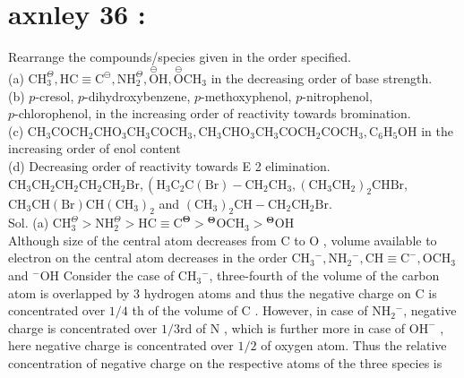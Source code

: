 \documentclass[10pt]{article}
\begin{document}
\section*{axnley 36 :}
Rearrange the compounds/species given in the order specified.\\
(a) $\mathrm{CH}_{3}^{\Theta}, \mathrm{HC} \equiv \mathrm{C}^{\ominus}, \mathrm{NH}_{2}^{\Theta}, \stackrel{\ominus}{\mathrm{O}} \mathrm{H}, \stackrel{\ominus}{\mathrm{O}} \mathrm{CH}_{3}$ in the decreasing order of base strength.\\
(b) $p$-cresol, $p$-dihydroxybenzene, $p$-methoxyphenol, $p$-nitrophenol,\\
$p$-chlorophenol, in the increasing order of reactivity towards bromination.\\
(c) $\mathrm{CH}_{3} \mathrm{COCH}_{2} \mathrm{CHO}_{3} \mathrm{CH}_{3} \mathrm{COCH}_{3}, \mathrm{CH}_{3} \mathrm{CHO}_{3} \mathrm{CH}_{3} \mathrm{COCH}_{2} \mathrm{COCH}_{3}, \mathrm{C}_{6} \mathrm{H}_{5} \mathrm{OH}$ in the increasing order of enol content\\
(d) Decreasing order of reactivity towards E 2 elimination.\\
$\mathrm{CH}_{3} \mathrm{CH}_{2} \mathrm{CH}_{2} \mathrm{CH}_{2} \mathrm{CH}_{2} \mathrm{Br},\left(\mathrm{H}_{3} \mathrm{C}_{2} \mathrm{C}(\mathrm{Br})-\mathrm{CH}_{2} \mathrm{CH}_{3},\left(\mathrm{CH}_{3} \mathrm{CH}_{2}\right)_{2} \mathrm{CHBr}\right.$,\\
$\mathrm{CH}_{3} \mathrm{CH}(\mathrm{Br}) \mathrm{CH}\left(\mathrm{CH}_{3}\right)_{2}$ and $\left(\mathrm{CH}_{3}\right)_{2} \mathrm{CH}-\mathrm{CH}_{2} \mathrm{CH}_{2} \mathrm{Br}$.\\
Sol. (a) $\mathrm{CH}_{3}^{\Theta}>\mathrm{NH}_{2}^{\Theta}>\mathrm{HC} \equiv \mathrm{C}^{\boldsymbol{\Theta}}>{ }^{\boldsymbol{\Theta}} \mathrm{OCH}_{3}>{ }^{\boldsymbol{\Theta}} \mathrm{OH}$\\
Although size of the central atom decreases from C to O , volume available to electron on the central atom decreases in the order $\mathrm{CH}_{3}{ }^{-}, \mathrm{NH}_{2}{ }^{-}, \mathrm{CH} \equiv \mathrm{C}^{-}, \mathrm{OCH}_{3}$ and ${ }^{-} \mathrm{OH}$ Consider the case of $\mathrm{CH}_{3}{ }^{-}$, three-fourth of the volume of the carbon atom is overlapped by 3 hydrogen atoms and thus the negative charge on C is concentrated over $1 / 4$ th of the volume of C . However, in case of $\mathrm{NH}_{2}{ }^{-}$, negative charge is concentrated over $1 / 3 \mathrm{rd}$ of N , which is further more in case of $\mathrm{OH}^{-}$ , here negative charge is concentrated over $1 / 2$ of oxygen atom. Thus the relative concentration of negative charge on the respective atoms of the three species is\\
\end{document}
